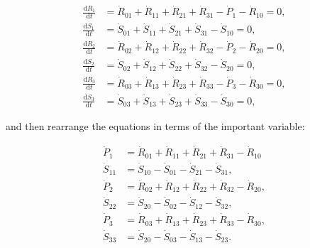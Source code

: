 \begin{align}
	\frac{\mathrm{d}R_{1}}{\mathrm{d}t} 	&
	= \dot{R}_{01}
	+ \dot{R}_{11}
	+ \dot{R}_{21}
	+ \dot{R}_{31}
	- \dot{P}_{1}
	- \dot{R}_{10}
	= 0,															\\
\label{eq:C_dS1}
	\frac{\mathrm{d}S_{1}}{\mathrm{d}t} 	&
	= \dot{S}_{01}
	+ \dot{S}_{11}
	+ \dot{S}_{21}
	+ \dot{S}_{31}
	- \dot{S}_{10}
	= 0,															\\
	\frac{\mathrm{d}R_{2}}{\mathrm{d}t} 	&
	= \dot{R}_{02}
	+ \dot{R}_{12}
	+ \dot{R}_{22}
	+ \dot{R}_{32}
	- \dot{P}_{2}
	- \dot{R}_{20}
	= 0,															\\
\label{eq:C_dS2}
	\frac{\mathrm{d}S_{2}}{\mathrm{d}t} 	&
	= \dot{S}_{02}
	+ \dot{S}_{12}
	+ \dot{S}_{22}
	+ \dot{S}_{32}
	- \dot{S}_{20}
	= 0,															\\
	\frac{\mathrm{d}R_{3}}{\mathrm{d}t} 	&
	= \dot{R}_{03}
	+ \dot{R}_{13}
	+ \dot{R}_{23}
	+ \dot{R}_{33}
	- \dot{P}_{3}
	- \dot{R}_{30}
	= 0,															\\
\label{eq:C_dS3}
	\frac{\mathrm{d}S_{3}}{\mathrm{d}t} 	&
	= \dot{S}_{03}
	+ \dot{S}_{13}
	+ \dot{S}_{23}
	+ \dot{S}_{33}
	- \dot{S}_{30}
	= 0,
\end{align}

\noindent{}and then rearrange the equations
in terms of the important variable:

\begin{align}
\label{eq:C_P1a}
	\dot{P}_{1}												&
	= \dot{R}_{01}
	+ \dot{R}_{11}
	+ \dot{R}_{21}
	+ \dot{R}_{31}
	- \dot{R}_{10}											\\
\label{eq:C_S11}
	\dot{S}_{11}											&
	= \dot{S}_{10}
	- \dot{S}_{01}
	- \dot{S}_{21}
	- \dot{S}_{31},										\\
\label{eq:C_P2a}
	\dot{P}_{2}												&
	= \dot{R}_{02}
	+ \dot{R}_{12}
	+ \dot{R}_{22}
	+ \dot{R}_{32}
	- \dot{R}_{20},										\\
\label{eq:C_S22}
	\dot{S}_{22}											&
	= \dot{S}_{20}
	- \dot{S}_{02} 
	- \dot{S}_{12}
	- \dot{S}_{32},										\\
\label{eq:C_P3a}
	\dot{P}_{3}												&
	= \dot{R}_{03}
	+ \dot{R}_{13}
	+ \dot{R}_{23}
	+ \dot{R}_{33}
	- \dot{R}_{30},										\\
\label{eq:C_S33}
	\dot{S}_{33}											&
	= \dot{S}_{20}
	- \dot{S}_{03}
	- \dot{S}_{13}
	- \dot{S}_{23}.	
\end{align}

%

